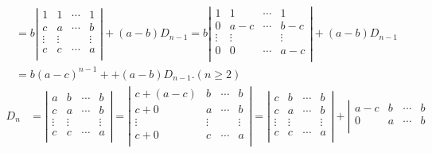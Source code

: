 \documentclass[lang=cn,newtx,10pt,scheme=chinese]{elegantbook}
\begin{document}
\begin{solution}
\begin{align*}
    &=b\left| \begin{matrix}
        1&		1&		\cdots&		1\\
        c&		a&		\cdots&		b\\
        \vdots&		\vdots&		&		\vdots\\
        c&		c&		\cdots&		a\\
    \end{matrix} \right|+\left( a-b \right) D_{n-1}=b\left| \begin{matrix}
        1&		1&		\cdots&		1\\
        0&		a-c&		\cdots&		b-c\\
        \vdots&		\vdots&		&		\vdots\\
        0&		0&		\cdots&		a-c\\
    \end{matrix} \right|+\left( a-b \right) D_{n-1}
    \\
    &=b\left( a-c \right) ^{n-1}++\left( a-b \right) D_{n-1}.\left( n\ge 2 \right) 
\end{align*}
\begin{align*}
    D_n&=\left| \begin{matrix}
        a&		b&		\cdots&		b\\
        c&		a&		\cdots&		b\\
        \vdots&		\vdots&		&		\vdots\\
        c&		c&		\cdots&		a\\
    \end{matrix} \right|=\left| \begin{matrix}
        c+\left( a-c \right)&		b&		\cdots&		b\\
        c+0&		a&		\cdots&		b\\
        \vdots&		\vdots&		&		\vdots\\
        c+0&		c&		\cdots&		a\\
    \end{matrix} \right|=\left| \begin{matrix}
        c&		b&		\cdots&		b\\
        c&		a&		\cdots&		b\\
        \vdots&		\vdots&		&		\vdots\\
        c&		c&		\cdots&		a\\
    \end{matrix} \right|+\left| \begin{matrix}
        a-c&		b&		\cdots&		b\\
        0&		a&		\cdots&		b\\

\end{matrix}
\end{align*}
\end{solution}
\end{document}
